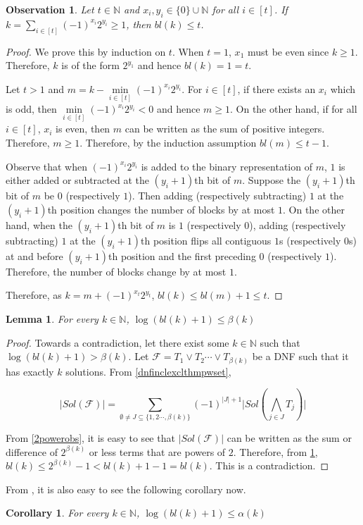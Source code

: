 \documentclass[11pt,a4paper]{article}
\newtheorem{lemma}[theorem]{Lemma}
\newtheorem{observation}[theorem]{Observation}
\newtheorem{corollary}[theorem]{Corollary}
\theoremstyle{definition}
\begin{document}
\begin{observation}\label{obs:num_blocks}
	Let $t \in \mathbb{N}$ and $x_i,y_i\in \{0\}\cup \mathbb{N}$ for all $i\in [t]$. If $k=\sum\limits_{i\in [t]}(-1)^{x_i}2^{y_i} \geq 1$, then 
	$bl(k)\leq t$.  
\end{observation}
\begin{proof}
We prove this by induction on $t$. When $t=1$, $x_1$ must be even since $k\geq 1$. Therefore, $k$ is of the form $2^{y_1}$ and hence $bl(k)=1=t$.
	
Let $t>1$ and $m=k-\min\limits_{i\in [t]} (-1)^{x_i}2^{y_i}$. For $i\in [t]$, if there exists an $x_i$ which is odd, then $\min\limits_{i\in [t]} (-1)^{x_i}2^{y_i} <0$ and hence $m \geq 1$. On the other hand, if for all $i\in [t]$, $x_i$ is even, then $m$ can be written as the sum of positive integers. Therefore, $m\geq 1$. Therefore, by the induction assumption $bl(m)\leq t-1$. 


Observe that when $(-1)^{x_i}2^{y_i}$ is added to the binary representation of $m$, $1$ is either added or subtracted at the $(y_i+1)$th bit of $m$. Suppose the $(y_i+1)$th bit of $m$ be $0$ (respectively $1$). Then adding (respectively subtracting) $1$ at the $(y_i+1)$th position changes the number of blocks by at most $1$. On the other hand, when the $(y_i+1)$th bit of $m$ is $1$ (respectively $0$), adding (respectively subtracting) $1$ at the $(y_i+1)$th position flips all contiguous $1$s (respectively $0$s) at and before $(y_i+1)$th position and the first preceding $0$ (respectively $1$). Therefore, the number of blocks change by at most $1$.

Therefore, as $k=m+(-1)^{x_t}2^{y_t}$, $bl(k)\leq bl(m)+1 \leq t$.
\end{proof}

\begin{lemma}
	For every $k\in \mathbb{N}$, $\log (bl(k)+1) \leq \beta(k)$    
\end{lemma}

\begin{proof}
	Towards a contradiction, let there exist some $k\in \mathbb{N}$ such that $\log (bl(k)+1) > \beta(k)$. Let $\mathcal{F}= T_1 \lor T_2 \cdots \lor T_{\beta(k)} $ be a DNF such that it has exactly $k$ solutions. From \cref{dnfinclexclthmpwset},
	
	$$|Sol(\mathcal{F})|=\sum_{\emptyset \neq J \subseteq \{1,2\cdots,\beta(k)\}}(-1)^{|J|+1}  \Biggl| Sol(\bigwedge_{j \in J} T_j)\Biggr|$$
	
	
	
	
	
	From \cref{2powerobs}, it is easy to see that $|Sol(\mathcal{F})|$ can be written as the sum or difference of $2^{\beta(k)}$ or less terms that are powers of $2$. Therefore, from \cref{obs:num_blocks}, $bl(k)\leq 2^{\beta(k)}-1 < bl(k)+1-1 = bl(k)$. This is a contradiction.
	
	
\end{proof}
From , it is also easy to see the following corollary now. 
\begin{corollary}
	For every $k\in \mathbb{N}$, $\log (bl(k)+1) \leq \alpha(k)$     
\end{corollary}
\end{document}
